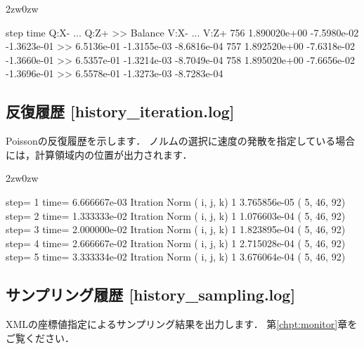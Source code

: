 \begin{indentation}{2zw}{0zw}
{\small
\begin{program}
    step         time         Q:X-   ...      Q:Z+ >>      Balance         V:X-   ...   V:Z+
     756 1.890020e+00  -7.5980e-02     -1.3623e-01 >>   6.5136e-01  -1.3155e-03  -8.6816e-04
     757 1.892520e+00  -7.6318e-02     -1.3660e-01 >>   6.5357e-01  -1.3214e-03  -8.7049e-04
     758 1.895020e+00  -7.6656e-02     -1.3696e-01 >>   6.5578e-01  -1.3273e-03  -8.7283e-04
\end{program}
}
\end{indentation}

%
\pagebreak
\subsection{反復履歴 [history\_iteration.log]}
Poissonの反復履歴を示します．
ノルムの選択に速度の発散を指定している場合には，計算領域内の位置が出力されます．

\begin{indentation}{2zw}{0zw}
{\small 
\begin{program}
step=               1  time= 6.666667e-03  Itration          Norm (     i,      j,      k)
                                                  1  3.765856e-05 (     5,     46,     92)
step=               2  time= 1.333333e-02  Itration          Norm (     i,      j,      k)
                                                  1  1.076603e-04 (     5,     46,     92)
step=               3  time= 2.000000e-02  Itration          Norm (     i,      j,      k)
                                                  1  1.823895e-04 (     5,     46,     92)
step=               4  time= 2.666667e-02  Itration          Norm (     i,      j,      k)
                                                  1  2.715028e-04 (     5,     46,     92)
step=               5  time= 3.333334e-02  Itration          Norm (     i,      j,      k)
                                                  1  3.676064e-04 (     5,     46,     92)
\end{program}
}
\end{indentation}


%
\pagebreak
\subsection{サンプリング履歴 [history\_sampling.log]}
\label{sec:XML_sampling_history}
XMLの座標値指定によるサンプリング結果を出力します．
第\ref{chpt:monitor}章をご覧ください．


